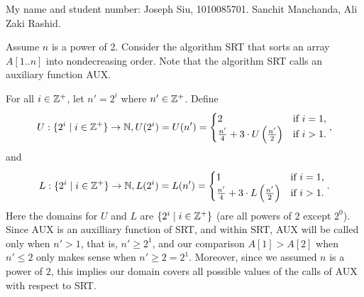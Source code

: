 \documentclass[11pt, sakura, night, 1in]{hw}
\begin{document}
My name and student number: Joseph Siu, 1010085701. Sanchit Manchanda, Ali Zaki Rashid.

Assume $n$ is a power of 2.
Consider the algorithm SRT that sorts an array $A[1..n]$ into nondecreasing order.
Note that the algorithm SRT calls an auxiliary function AUX.

\begin{comment}

\newfunc{\tbf{SRT}$(\A[1..n],n)$:}{
        \aif{$n>1$ then}{
            \as $\SRT(\A[1..\frac{n}{2}],\frac{n}{2})$
            \as $\SRT(\A[(\frac{n}{2}+1)..n],\frac{n}{2})$
            \as $\AUX(\A[1..n],n)$
        }
    }

\newfunc{\tbf{AUX}($\A[1..n],n$):}{
    \aif{$n>2$ then}{
        \afor{\ag{i}{1}\ato $\frac{n}{4}$ do}{
            \as swap the value of $A[i+\frac{n}{4}]$ and $A[i+\frac{n}{2}]$
        }
        \as $\AUX(\A[1..\frac{n}{2}],\frac{n}{2})$
        \as $\AUX(\A[(\frac{n}{2}+1)..n],\frac{n}{2})$
        \as $\AUX(\A[(\frac{n}{4}+1)..\frac{3n}{4}],\frac{n}{2})$
    \aelif{$A[1]>A[2]$ then}
        \as swap the value of $A[1]$ and $A[2]$
    }
}

\newq{1}{
    Give recursive definitions of functions $U(n')$ and $L(n')$, which are, respectively, a good upper bound and a good lower bound on the wrost case number of steps performed by AUX($A[1..n'],n'$), where steps are array element comparisons and swap operations.

    Justify your answers and remember to define the domains of your functions.
}
\end{comment}


For all $i\in\mathbb{Z}^+$, let $n'=2^i$ where $n'\in\mathbb{Z}^+$. Define \[U:\{2^i\mid i\in\mathbb{Z}^+\}\to\mathbb{N}, U(2^i)=U(n')=\begin{cases}
    2 & \text{if } i=1,\\
    \frac{n'}{4} + 3\cdot U\left(\frac{n'}{2}\right) & \text{if } i>1.
\end{cases},\] and \[L:\{2^i\mid i\in\mathbb{Z}^+\}\to\mathbb{N}, L(2^i)=L(n')=\begin{cases}
    1 & \text{if } i=1,\\
    \frac{n'}{4} + 3\cdot L\left(\frac{n'}{2}\right) & \text{if } i>1.
\end{cases}.\] Here the domains for $U$ and $L$ are $\{2^i\mid i\in\mathbb{Z}^+\}$ (are all powers of 2 except $2^0$). Since AUX is an auxilliary function of SRT, and within SRT, AUX will be called only when $n'>1$, that is, $n'\ge 2^1$, and our comparison $A[1]>A[2]$ when $n'\le 2$ only makes sense when $n'\ge 2 = 2^1$. Moreover, since we assumed $n$ is a power of $2$, this implies our domain covers all possible values of the calls of AUX with respect to SRT.
\end{document}

